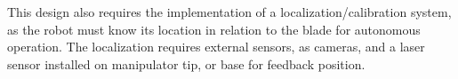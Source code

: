 

This design also requires the implementation of a localization/calibration
system, as the robot must know its location in relation to the blade for
autonomous operation. The localization requires external sensors, as cameras,
and a laser sensor installed on manipulator tip, or base for feedback position.




